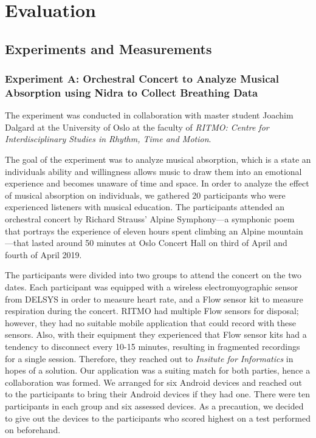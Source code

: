 \chapter{Evaluation}
\section{Experiments and Measurements}
\subsection{Experiment A: Orchestral Concert to Analyze Musical Absorption using Nidra to Collect Breathing Data}
The experiment was conducted in collaboration with master student Joachim Dalgard at the University of Oslo at the faculty of \textit{RITMO: Centre for Interdisciplinary Studies in Rhythm, Time and Motion}. 

The goal of the experiment was to analyze musical absorption, which is a state an individuals ability and willingness allows music to draw them into an emotional experience and becomes unaware of time and space. In order to analyze the effect of musical absorption on individuals, we gathered 20 participants who were experienced listeners with musical education. The participants attended an orchestral concert by Richard Strauss' Alpine Symphony---a symphonic poem that portrays the experience of eleven hours spent climbing an Alpine mountain---that lasted around 50 minutes at Oslo Concert Hall on third of April and fourth of April 2019.  

The participants were divided into two groups to attend the concert on the two dates. Each participant was equipped with a wireless electromyographic sensor from DELSYS in order to measure heart rate, and a Flow sensor kit to measure respiration during the concert. RITMO had multiple Flow sensors for disposal; however, they had no suitable mobile application that could record with these sensors. Also, with their equipment they experienced that Flow sensor kits had a tendency to disconnect every 10-15 minutes, resulting in fragmented recordings for a single session. Therefore, they reached out to \textit{Insitute for Informatics} in hopes of a solution. Our application was a suiting match for both parties, hence a collaboration was formed. We arranged for six Android devices and reached out to the participants to bring their Android devices if they had one. There were ten participants in each group and six assessed devices. As a precaution, we decided to give out the devices to the participants who scored highest on a test performed on beforehand.

